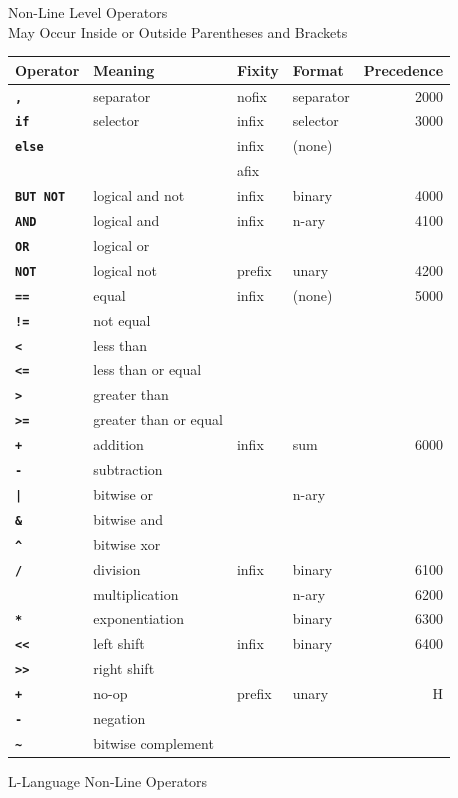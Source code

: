 \documentclass[12pt]{article}
\newcommand{\ttkey}[1]{{\tt \bfseries #1}}
\newlength{\figurewidth}
\newenvironment{boxedfigure}[1][!btp]%
	{\begin{figure*}[#1]
	 \begin{lrbox}{\figurebox}
	 \begin{minipage}{\figurewidth}

	 \vspace*{1ex}}%
	{
	 \vspace*{1ex}

	 \end{minipage}
	 \end{lrbox}

	 \centering
	 \fbox{\hspace*{0.1in}\usebox{\figurebox}\hspace*{0.1in}}
	 \end{figure*}}
\begin{document}
\begin{boxedfigure}[!h]
\begin{center}
Non-Line Level Operators \\
May Occur Inside or Outside Parentheses and Brackets
\\[1ex]
\begin{tabular}{|l|l|l|l|r|}
\hline
Operator & Meaning & Fixity & Format & Precedence \\
\hline
\ttkey{,} & separator & nofix & separator & 2000
\\\hline
\ttkey{if} & selector & infix & selector & 3000
\\\cline{1-1}\cline{3-4}
\ttkey{else} & & infix & (none) & \\
             & & afix & &
\\\hline
\ttkey{BUT NOT} & logical and not & infix & binary & 4000
\\\hline
\ttkey{AND} & logical and & infix & n-ary & 4100
\\\cline{1-2}
\ttkey{OR}  & logical or  & & &
\\\hline
\ttkey{NOT}  & logical not & prefix & unary & 4200
\\\hline
\ttkey{==}  & equal & infix & (none) & 5000
\\\cline{1-2}
\ttkey{!=}  & not equal & & &
\\\cline{1-2}
\ttkey{<}  & less than & & &
\\\cline{1-2}
\ttkey{<=}  & less than or equal & & &
\\\cline{1-2}
\ttkey{>}  & greater than & & &
\\\cline{1-2}
\ttkey{>=}  & greater than or equal & & &
\\\hline
\ttkey{+}  & addition & infix & sum & 6000
\\\cline{1-2}
\ttkey{-}  & subtraction & & &
\\\cline{1-2}\cline{4-4}
\ttkey{|}  & bitwise or & & n-ary &
\\\cline{1-2}
\ttkey{\&}  & bitwise and & & &
\\\cline{1-2}
\ttkey{\textasciicircum}  & bitwise xor & & &
\\\hline
\ttkey{/}  & division & infix & binary & 6100
\\\cline{1-2}\cline{4-5}
\ttkey{*}  & multiplication & & n-ary & 6200
\\\cline{1-2}\cline{4-5}
\ttkey{**}  & exponentiation & & binary & 6300
\\\hline
\ttkey{<{}<}  & left shift & infix & binary & 6400
\\\cline{1-2}
\ttkey{>{}>}  & right shift & & &
\\\hline
\ttkey{+}  & no-op & prefix & unary & H
\\\cline{1-2}
\ttkey{-}  & negation & & & 
\\\cline{1-2}
\ttkey{\textasciitilde}  & bitwise complement & & & 
\\\hline

\end{tabular}
\end{center}

\caption{L-Language Non-Line Operators}
\label{L-LANGUAGE-NON-LINE-OPERATORS}
\end{boxedfigure}
\end{document}
